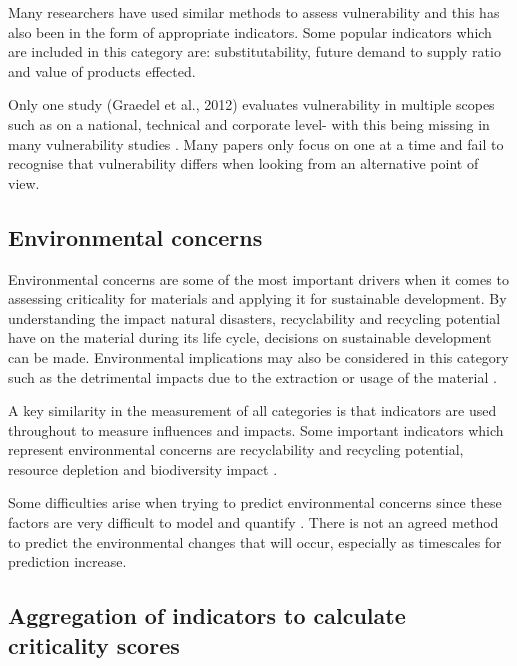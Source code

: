 \documentclass{article}
\begin{document}
Many researchers have used similar methods to assess vulnerability and this has also been in the form of appropriate indicators. Some popular indicators which are included in this category are: substitutability, future demand to supply ratio and value of products effected. 

Only one study (Graedel et al., 2012) evaluates vulnerability in multiple scopes such as on a national, technical and corporate level- with this being missing in many vulnerability studies \cite{helbig2016evaluate}. Many papers only focus on one at a time and fail to recognise that vulnerability differs when looking from an alternative point of view. 


\subsection{Environmental concerns}
Environmental concerns are some of the most important drivers when it comes to assessing criticality for materials and applying it for sustainable development. By understanding the impact natural disasters, recyclability and recycling potential have on the material during its life cycle, decisions on sustainable development can be made. Environmental implications may also be considered in this category such as the detrimental impacts due to the extraction or usage of the material \cite{gloser2014analyse}.

A key similarity in the measurement of all categories is that indicators are used throughout to measure influences and impacts. Some important indicators which represent environmental concerns are recyclability and recycling potential, resource depletion and biodiversity impact \cite{DAW2017173}. 

Some difficulties arise when trying to predict environmental concerns since these factors are very difficult to model and quantify \cite{schrijvers2020review}. There is not an agreed method to predict the environmental changes that will occur, especially as timescales for prediction increase.  


\subsection{Aggregation of indicators to calculate criticality scores}
\end{document}
